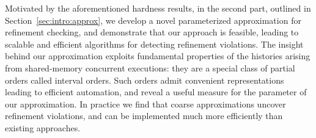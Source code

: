 
Motivated by the aforementioned hardness results, in the second part, outlined
in Section~\ref{sec:intro:approx}, we develop a novel parameterized
approximation for refinement checking, and demonstrate that our approach is
feasible, leading to scalable and efficient algorithms for detecting refinement
violations. The insight behind our approximation exploits fundamental
properties of the histories arising from shared-memory concurrent executions:
they are a special class of partial orders called interval orders. Such orders
admit convenient representations leading to efficient automation, and reveal a
useful measure for the parameter of our approximation. In practice we find that
coarse approximations uncover refinement violations, and can be implemented
much more efficiently than existing approaches.


